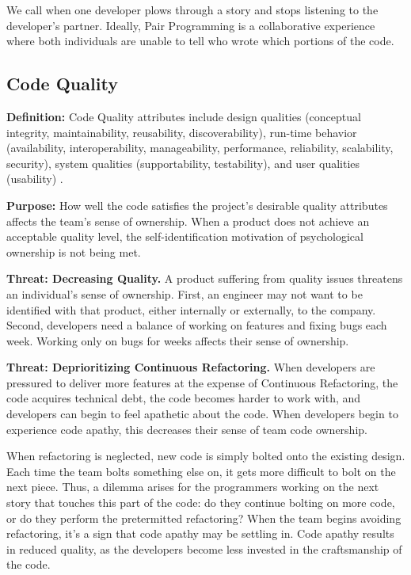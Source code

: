 We call  when one developer plows through a story and stops listening to the developer’s partner. Ideally, Pair Programming is a collaborative experience where both individuals are unable to tell who wrote which portions of the code. 

\subsection{Code Quality}
\textbf{Definition:} Code Quality attributes include design qualities (conceptual integrity, maintainability, reusability, discoverability), run-time behavior (availability, interoperability, manageability, performance, reliability, scalability, security), system qualities (supportability, testability), and user qualities (usability) \cite{Meier2009}. 

\textbf{Purpose:} How well the code satisfies the project’s desirable quality attributes affects the team’s sense of ownership. When a product does not achieve an acceptable quality level, the self-identification motivation of psychological ownership is not being met. 
 
\textbf{Threat: Decreasing Quality.} A product suffering from quality issues threatens an individual's sense of ownership. First, an engineer may not want to be identified with that product, either internally or externally, to the company. Second, developers need a balance of working on features and fixing bugs each week. Working only on bugs for weeks affects their sense of ownership.    

\textbf{Threat: Deprioritizing Continuous Refactoring.} When developers are pressured to deliver more features at the expense of Continuous Refactoring, the code acquires technical debt, the code becomes harder to work with, and developers can begin to feel apathetic about the code. When developers begin to experience code apathy, this decreases their sense of team code ownership. 

When refactoring is neglected, new code is simply bolted onto the existing design. Each time the team bolts something else on, it gets more difficult to bolt on the next piece. Thus, a dilemma arises for the programmers working on the next story that touches this part of the code: do they continue bolting on more code, or do they perform the pretermitted refactoring? When the team begins avoiding refactoring, it's a sign that code apathy may be settling in. Code apathy results in reduced quality, as the developers become less invested in the craftsmanship of the code.

